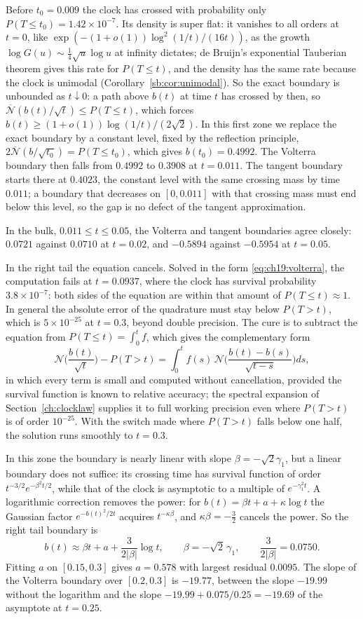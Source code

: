 Before $t_0=0.009$ the clock has crossed with probability only $P(T\le t_0)=1.42\times10^{-7}$. Its density is super flat: it vanishes to all orders at $t=0$, like $\exp(-(1+o(1))\log^2(1/t)/(16t))$, as the growth $\log G(u)\sim\frac14\sqrt u\log u$ at infinity dictates; de Bruijn's exponential Tauberian theorem \cite[Theorem 4.12.9]{BGT87} gives this rate for $P(T\le t)$, and the density has the same rate because the clock is unimodal (Corollary~\ref{sb:cor:unimodal}). So the exact boundary is unbounded as $t\downarrow0$: a path above $b(t)$ at time $t$ has crossed by then, so $\overline{\mathcal N}(b(t)/\sqrt t)\le P(T\le t)$, which forces $b(t)\ge(1+o(1))\log(1/t)/(2\sqrt2)$. In this first zone we replace the exact boundary by a constant level, fixed by the reflection principle, $2\overline{\mathcal N}(b/\sqrt{t_0})=P(T\le t_0)$, which gives $b(t_0)=0.4992$. The Volterra boundary then falls from $0.4992$ to $0.3908$ at $t=0.011$. The tangent boundary starts there at $0.4023$, the constant level with the same crossing mass by time $0.011$; a boundary that decreases on $[0,0.011]$ with that crossing mass must end below this level, so the gap is no defect of the tangent approximation.

In the bulk, $0.011\le t\le0.05$, the Volterra and tangent boundaries agree closely: $0.0721$ against $0.0710$ at $t=0.02$, and $-0.5894$ against $-0.5954$ at $t=0.05$.

In the right tail the equation cancels. Solved in the form \eqref{eq:ch19:volterra}, the computation fails at $t=0.0937$, where the clock has survival probability $3.8\times10^{-7}$: both sides of the equation are within that amount of $P(T\le t)\approx1$. In general the absolute error of the quadrature must stay below $P(T>t)$, which is $5\times10^{-25}$ at $t=0.3$, beyond double precision. The cure is to subtract the equation from $P(T\le t)=\int_0^tf$, which gives the complementary form
\[
\mathcal N\Big(\frac{b(t)}{\sqrt t}\Big)-P(T>t)=\int_0^tf(s)\,\mathcal N\Big(\frac{b(t)-b(s)}{\sqrt{t-s}}\Big)ds,
\]
in which every term is small and computed without cancellation, provided the survival function is known to relative accuracy; the spectral expansion of Section~\ref{ch:clocklaw} supplies it to full working precision even where $P(T>t)$ is of order $10^{-25}$. With the switch made where $P(T>t)$ falls below one half, the solution runs smoothly to $t=0.3$.

In this zone the boundary is nearly linear with slope $\beta=-\sqrt2\gamma_1$, but a linear boundary does not suffice: its crossing time has survival function of order $t^{-3/2}e^{-\beta^2t/2}$, while that of the clock is asymptotic to a multiple of $e^{-\gamma_1^2t}$. A logarithmic correction removes the power: for $b(t)=\beta t+a+\kappa\log t$ the Gaussian factor $e^{-b(t)^2/2t}$ acquires $t^{-\kappa\beta}$, and $\kappa\beta=-\frac32$ cancels the power. So the right tail boundary is
\[
b(t)\approx\beta t+a+\frac{3}{2|\beta|}\log t,\qquad \beta=-\sqrt2\,\gamma_1,\qquad \frac3{2|\beta|}=0.0750 .
\]
Fitting $a$ on $[0.15,0.3]$ gives $a=0.578$ with largest residual $0.0095$. The slope of the Volterra boundary over $[0.2,0.3]$ is $-19.77$, between the slope $-19.99$ without the logarithm and the slope $-19.99+0.075/0.25=-19.69$ of the asymptote at $t=0.25$.


